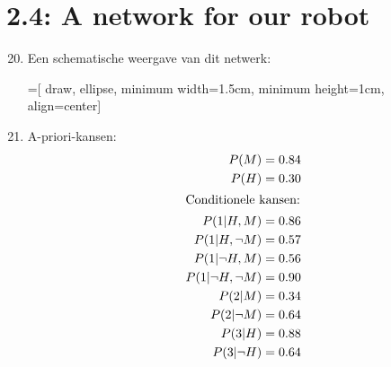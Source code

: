 \documentclass[a4paper,10pt,fleqn]{article}
\begin{document}
\section*{2.4: A network for our robot}
\begin{enumerate}[1.]
    \setcounter{enumi}{19}
    \item Een schematische weergave van dit netwerk:

    =[
            draw, ellipse, minimum width=1.5cm, minimum height=1cm, align=center]
    \begin{centering}

    \end{centering}

    \item
        A-priori-kansen:
        \begin{align*}
            P(M)                    & = 0.84 \\
            P(H)                    & = 0.30 \\
        \intertext{Conditionele kansen:}
            P(1 | H, M)             & = 0.86 \\
            P(1 | H, \neg M)        & = 0.57 \\
            P(1 | \neg H, M)        & = 0.56 \\
            P(1 | \neg H, \neg M)   & = 0.90 \\
            P(2 | M)                & = 0.34 \\
            P(2 | \neg M)           & = 0.64 \\
            P(3 | H)                & = 0.88 \\
            P(3 | \neg H)           & = 0.64 \\
        \end{align*}



\end{enumerate}
\end{document}
